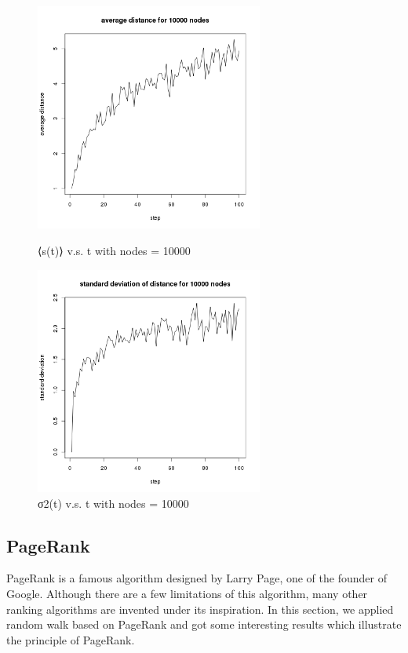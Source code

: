 \documentclass[draftcls,12pt,onecolumn]{IEEEtran}
\begin{document}
\begin{figure}[htbp]
\centering
\begin{minipage}[t]{0.48\textwidth}
\centering
\includegraphics[width=7.5cm]{2_2_d_10000_distance.png}
\caption{⟨s(t)⟩ v.s. t with nodes = 10000}
\label{fig16}
\end{minipage}
\begin{minipage}[t]{0.48\textwidth}
\centering
\includegraphics[width=7.5cm]{2_2_d_10000_deviation.png}
\caption{σ2(t) v.s. t with nodes = 10000}
\label{fig17}
\end{minipage}
\end{figure}







\subsection{PageRank}
PageRank is a famous algorithm designed by Larry Page, one of the founder of Google. Although there are a few limitations of this algorithm, many other ranking algorithms are invented under its inspiration. In this section, we applied random walk based on PageRank and got some interesting results which illustrate the principle of PageRank.
\end{document}

